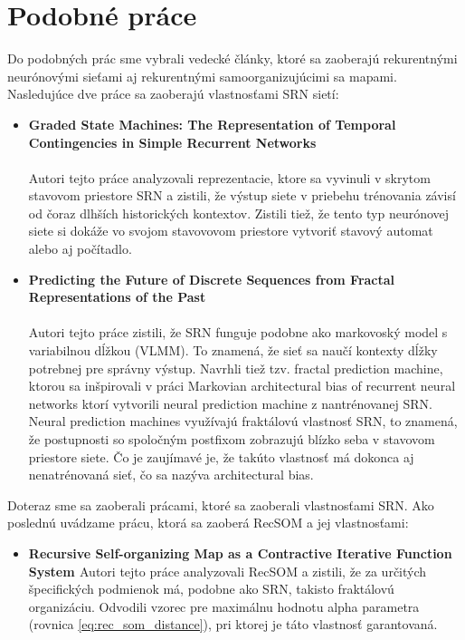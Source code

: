 \chapter{Podobné práce}

Do podobných prác sme vybrali vedecké články, ktoré sa zaoberajú rekurentnými neurónovými sieťami aj rekurentnými 
samoorganizujúcimi sa mapami.
Nasledujúce dve práce sa zaoberajú vlastnosťami SRN sietí:
\begin{itemize}
    \item \textbf{
        Graded State Machines: The Representation of Temporal Contingencies in Simple Recurrent Networks \cite{Servan-Schreiber1991}}
         \\ \\
    Autori tejto práce analyzovali reprezentacie, 
    ktore sa vyvinuli v skrytom stavovom priestore SRN a zistili, 
    že výstup siete v priebehu trénovania závisí od čoraz dlhších 
    historických kontextov. 
    Zistili tiež, že tento typ neurónovej siete si dokáže 
    vo svojom stavovovom priestore vytvoriť stavový automat alebo aj počítadlo.

    \item \textbf{
        Predicting the Future of Discrete Sequences from Fractal Representations of the Past  \cite{Tino2001}} \\ \\
    Autori tejto práce zistili, že SRN funguje podobne ako markovoský model s variabilnou dĺžkou (VLMM). 
    To znamená, že sieť sa naučí kontexty dĺžky potrebnej pre správny výstup. 
    Navrhli tiež tzv. fractal prediction machine, ktorou sa inšpirovali v práci Markovian architectural bias of recurrent neural networks \cite{markovnian_bias} ktorí vytvorili neural prediction machine z nantrénovanej SRN.
    Neural prediction machines využívajú fraktálovú vlastnosť SRN, to znamená, 
    že postupnosti so spoločným postfixom zobrazujú blízko seba v stavovom priestore siete. 
    Čo je zaujímavé je, že takúto vlastnosť má dokonca aj nenatrénovaná sieť, čo sa nazýva architectural bias.
\end{itemize}

Doteraz sme sa zaoberali prácami, ktoré sa zaoberali vlastnosťami SRN.
Ako poslednú uvádzame prácu, ktorá sa zaoberá RecSOM a jej vlastnosťami:
\begin{itemize}
    \item \textbf{Recursive Self-organizing Map
    as a Contractive Iterative Function System \cite{rsm}}
    Autori tejto práce analyzovali RecSOM a zistili, že za určitých 
    špecifických podmienok má, podobne ako SRN, takisto fraktálovú organizáciu. 
    Odvodili vzorec pre maximálnu hodnotu alpha parametra (rovnica \ref{eq:rec_som_distance}), 
    pri ktorej je táto vlastnosť garantovaná.
\end{itemize}


